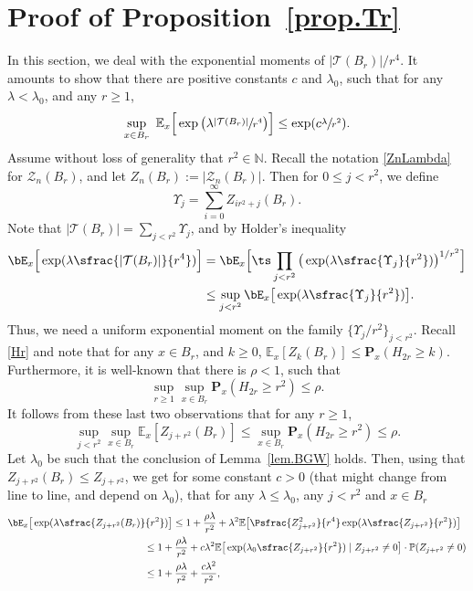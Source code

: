 \section{Proof of Proposition~\ref{prop.Tr}}\label{sec-Tr}
In this section, we deal with the exponential moments of
$ |\mathcal T(B_r)|/r^4$. It amounts to show that there are positive constants $c$ and $\lambda_0$, such that for
any $\lambda<\lambda_0$, and any $r\ge 1$,
\[
\sup_{x\in B_r} \ \mathbb E_x\Big[
\exp\big(\lambda\sfrac{ |\mathbf{\mathcal T}(B_r)|}{r^4}\big)\Big]
\le \exp(c\sfrac{\lambda}{r^2}).
\]
Assume without loss of generality that $r^2\in \mathbb N$. Recall the notation \eqref{ZnLambda} for $\mathcal Z_n(B_r)$, and let $Z_n(B_r) := |\mathcal Z_n(B_r)|$.
Then for $0\le j<r^2$, we define
\begin{equation*}
\Upsilon_j=\sum_{i=0}^\infty Z_{ir^2+j}(B_r).
\end{equation*}
Note that $ |\mathcal T(B_r)|=\sum_{j<r^2} \Upsilon_j$, and by Holder's
inequality
\begin{equation}\label{old-2}
\begin{aligned}
\bE_x\Big[\exp(\lambda \sfrac{|\mathcal T(B_r)|}{r^4})\Big]&=
\bE_x\Big[\ts\prod_{j<r^2}\big(
\exp(\lambda\sfrac{\Upsilon_j}{r^2})\big)^{1/r^2}\Big]\\
&\le
\sup_{j<r^2} \bE_x\big[\exp(\lambda\sfrac{\Upsilon_j}{r^2})\big].
\end{aligned}
\end{equation}
Thus, we need a uniform exponential moment on the family
$\{\Upsilon_j/r^2\}_{j<r^2}$.
Recall \eqref{Hr} and note that for any $x\in B_r$, and $k\ge 0$, $\mathbb E_x[Z_k(B_r)] \le \mathbf P_x(H_{2r}\ge k)$. Furthermore,
it is well-known that
there is $\rho<1$, such that
\[
\sup_{r\ge 1} \sup_{x\in B_r} \mathbf P_x(H_{2r} \ge r^2)\le \rho.
\]
It follows from these last two observations that for any $r\ge 1$,
\[
\sup_{j<r^2}\sup_{x\in B_r} \mathbb E_x[Z_{j+r^2}(B_r)]
\le \sup_{x\in B_r} \mathbf P_x(H_{2r}\ge r^2) \le \rho.
\]
Let $\lambda_0$ be such that the conclusion of Lemma~\ref{lem.BGW} holds.
Then, using that $Z_{j+r^2}(B_r)\le Z_{j+r^2}$,
we get for some constant $c>0$ (that might change from line to line, and depend on $\lambda_0$),
that for any $\lambda\le \lambda_0$, any $j<r^2$ and $x\in B_r$
\begin{equation*}
\begin{split}
\bE_x\big[\exp(\lambda \sfrac{Z_{j+r^2}(B_r)}{r^2})\big]&
\le 1+ \frac{\rho \lambda}{r^2} + \lambda^2\mathbb E
\big[\Psfrac{Z_{j+r^2}^2}{r^4}\exp(\lambda \sfrac{Z_{j+r^2}}{r^2})\big]\\
&\hspace*{-1cm} \le 1+ \frac{\rho \lambda}{r^2} +
c\lambda^2
\mathbb E\big[\exp(\lambda_0\sfrac{Z_{j+r^2}}{r^2})
\mid Z_{j+r^2}\neq 0\big]\cdot \mathbb P(Z_{j+r^2} \neq 0) \\
&\hspace*{-1cm} \le 1+ \frac{\rho \lambda}{r^2} +\frac{c \lambda^2}{r^2},
\end{split}
\end{equation*}
